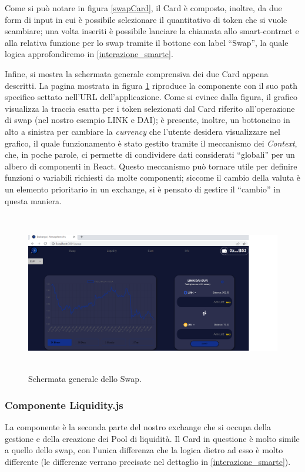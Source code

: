Come si può notare in figura \ref{swapCard}, il Card è composto, inoltre, da due form di input in cui è possibile selezionare il quantitativo di token che si vuole scambiare; una volta inseriti è possibile lanciare la chiamata allo smart-contract e alla relativa funzione per lo swap tramite il bottone con label “Swap”, la quale logica approfondiremo in \ref{interazione_smartc}.

Infine, si mostra la schermata generale comprensiva dei due Card appena descritti. La pagina mostrata in figura \ref{schermataSwap} riproduce la componente 
 con il suo path specifico settato nell'URL dell'applicazione. Come si evince dalla figura, il grafico visualizza la traccia esatta per i token selezionati dal Card riferito all'operazione di swap (nel nostro esempio LINK e DAI); è presente, inoltre, un bottoncino in alto a sinistra per cambiare la \textit{currency} che l'utente desidera visualizzare nel grafico, il quale funzionamento è stato gestito tramite il meccanismo dei \textit{Context}, che, in poche parole, ci permette di condividere dati considerati “globali” per un albero di componenti in React. Questo meccanismo può tornare utile per definire funzioni o variabili richiesti da molte componenti; siccome il cambio della valuta è un elemento prioritario in un exchange, si è pensato di gestire il “cambio” in questa maniera.

\begin{figure}[h]
    \centering
    \includegraphics[width=15cm,height=7cm]{Immagini/SwapSchermata.png}
    \caption[Schermata generale dello Swap]{Schermata generale dello Swap.}
    \label{schermataSwap}
\end{figure}

\subsubsection{Componente Liquidity.js}\makeatletter{}\makeatother\label{Liquidity.js}
La componente  è la seconda parte del nostro exchange che si occupa della gestione e della creazione dei Pool di liquidità. Il Card in questione è molto simile a quello dello swap, con l'unica differenza che la logica dietro ad esso è molto differente (le differenze verrano precisate nel dettaglio in \ref{interazione_smartc}).


